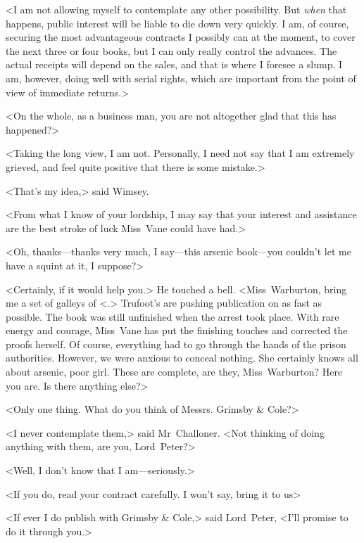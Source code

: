 <I am not allowing myself to contemplate any other possibility. But \emph{when} that happens, public interest will be liable to die down very quickly. I am, of course, securing the most advantageous contracts I possibly can at the moment, to cover the next three or four books, but I can only really control the advances. The actual receipts will depend on the sales, and that is where I foresee a slump. I am, however, doing well with serial rights, which are important from the point of view of immediate returns.>

<On the whole, as a business man, you are not altogether glad that this has happened?>

<Taking the long view, I am not. Personally, I need not say that I am extremely grieved, and feel quite positive that there is some mistake.>

<That's my idea,> said Wimsey.

<From what I know of your lordship, I may say that your interest and assistance are the best stroke of luck Miss~Vane could have had.>

<Oh, thanks—thanks very much, I say—this arsenic book—you couldn't let me have a squint at it, I suppose?>

<Certainly, if it would help you.> He touched a bell. <Miss~Warburton, bring me a set of galleys of <.> Trufoot's are pushing publication on as fast as possible. The book was still unfinished when the arrest took place. With rare energy and courage, Miss~Vane has put the finishing touches and corrected the proofs herself. Of course, everything had to go through the hands of the prison authorities. However, we were anxious to conceal nothing. She certainly knows all about arsenic, poor girl. These are complete, are they, Miss~Warburton? Here you are. Is there anything else?>

<Only one thing. What do you think of Messrs. Grimsby \& Cole?>

<I never contemplate them,> said Mr~Challoner. <Not thinking of doing anything with them, are you, Lord~Peter?>

<Well, I don't know that I am—seriously.>

<If you do, read your contract carefully. I won't say, bring it to us\longdash>

<If ever I do publish with Grimsby \& Cole,> said Lord~Peter, <I'll promise to do it through you.>